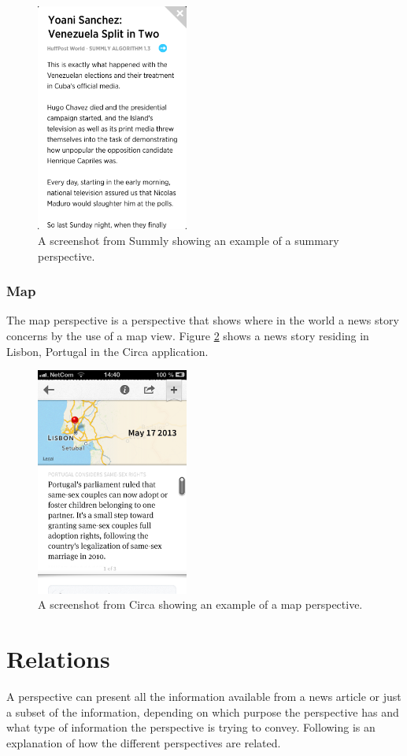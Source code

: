\begin{figure}[!htbp]
\centering
\includegraphics[width=50mm]{GFX/perspectives/summaryViewSummly.png}
\caption{A screenshot from Summly showing an example of a summary perspective.}
\label{summary_summly}
\end{figure}

\subsubsection{Map}
The map perspective is a perspective that shows where in the world a news story concerns by the use of a map view. Figure \ref{map_circa} shows a news story residing in Lisbon, Portugal in the Circa application.

\begin{figure}[!htbp]
\centering
\includegraphics[width=50mm]{GFX/perspectives/mapViewCirca.png}
\caption{A screenshot from Circa showing an example of a map perspective.}
\label{map_circa}
\end{figure}

\section{Relations}
A perspective can present all the information available from a news article or just a subset of the information, depending on which purpose the perspective has and what type of information the perspective is trying to convey. Following is an explanation of how the different perspectives are related.


